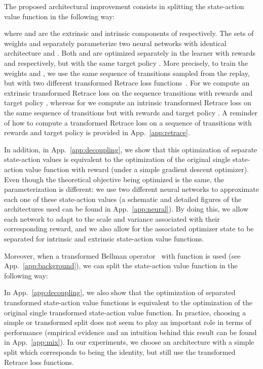 \documentclass{article}
\begin{document}
The proposed architectural improvement consists in splitting the state-action value function in the following way:

where  and  are the extrinsic and intrinsic components of  respectively. The sets of weights  and  separately parameterize two neural networks with identical architecture and . Both  and  are optimized separately in the learner with rewards  and  respectively, but with the same target policy . More precisely, to train the weights  and , we use the same sequence of transitions sampled from the replay, but with two different transformed Retrace loss functions~\citep{munos2016safe}. For  we compute an extrinsic transformed Retrace loss on the sequence transitions with rewards  and target policy , whereas for  we compute an intrinsic transformed Retrace loss on the same sequence of transitions but with rewards  and target policy . A reminder of how to compute a transformed Retrace loss on a sequence of transitions with rewards  and target policy  is provided in App.~\ref{app:retrace}.

In addition, in App.~\ref{app:decoupling}, we show that this optimization of separate state-action values is equivalent to the optimization of the original single state-action value function with reward  (under a simple gradient descent optimizer). Even though the theoretical objective being optimized is the same, the parameterization is different: we use two different neural networks to approximate each one of these state-action values (a schematic and detailed figures of the architectures used can be found in App.~\ref{app:neural}). By doing this, we allow each network to adapt to the scale and variance associated with their corresponding reward, and we also allow for the associated optimizer state to be separated for intrinsic and extrinsic state-action value functions.

Moreover, when a transformed Bellman operator~\citep{pohlen2018observe} with function  is used (see App.~\ref{app:background}), we can split the state-action value function in the following way:

In App.~\ref{app:decoupling}, we also show that the optimization of separated transformed state-action value functions is equivalent to the optimization of the original single transformed state-action value function. In practice, choosing a simple or transformed split does not seem to play an important role in terms of performance (empirical evidence and an intuition behind this result can be found in App.~\ref{app:mix}). In our experiments, we choose an architecture with a simple split which corresponds to  being the identity, but still use the transformed Retrace loss functions.
\end{document}
